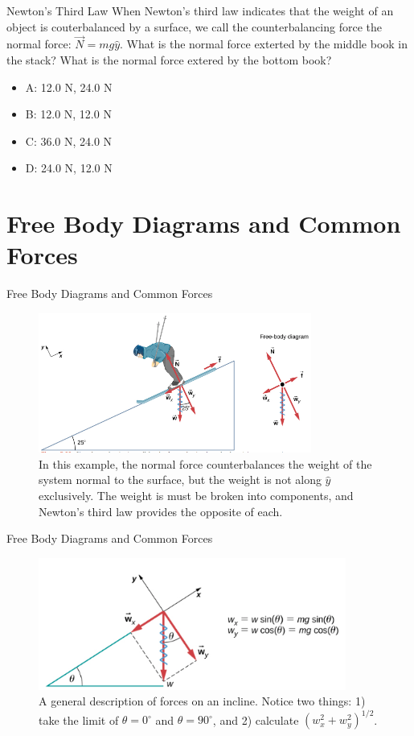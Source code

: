 \documentclass{beamer}
\begin{document}
\begin{frame}{Newton's Third Law}
When Newton's third law indicates that the weight of an object is couterbalanced by a surface, we call the counterbalancing force the \alert{normal force}: $\vec{N} = mg\hat{y}$.  What is the normal force exterted by the middle book in the stack?  What is the normal force extered by the bottom book?
\begin{itemize}
\item A: 12.0 N, 24.0 N
\item B: 12.0 N, 12.0 N
\item C: 36.0 N, 24.0 N
\item D: 24.0 N, 12.0 N
\end{itemize}
\end{frame}

\section{Free Body Diagrams and Common Forces}

\begin{frame}{Free Body Diagrams and Common Forces}
\begin{figure}
\centering
\includegraphics[width=0.8\textwidth,trim=0cm 0.1cm 0cm 0cm,clip=true]{figures/incline.png}
\caption{\label{fig:incline} In this example, the normal force counterbalances the weight of the system normal to the surface, but the weight is not along $\hat{y}$ exclusively.  The weight is must be broken into components, and Newton's third law provides the opposite of each.}
\end{figure}
\end{frame}

\begin{frame}{Free Body Diagrams and Common Forces}
\begin{figure}
\centering
\includegraphics[width=0.9\textwidth]{figures/incline2.png}
\caption{\label{fig:incline2} A general description of forces on an incline.  Notice two things: 1) take the limit of $\theta = 0^{\circ}$ and $\theta = 90^{\circ}$, and 2) calculate $(w_x^2+w_y^2)^{1/2}$.}
\end{figure}
\end{frame}
\end{document}
